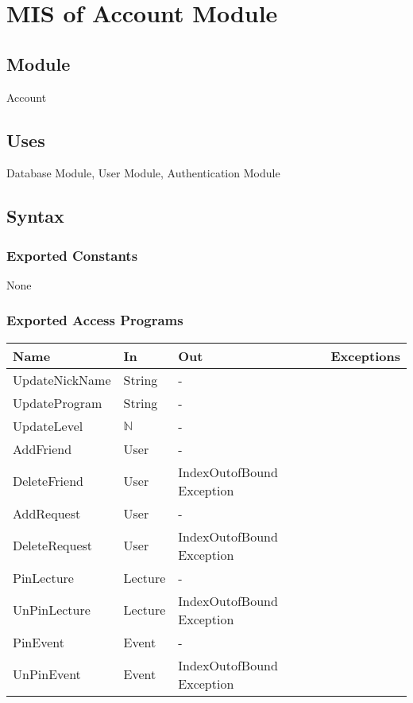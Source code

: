 \documentclass[12pt, titlepage]{article}
\begin{document}
\section{MIS of Account Module} \label{mAccount}

\subsection{Module}

Account

\subsection{Uses}

Database Module, User Module, Authentication Module

\subsection{Syntax}

\subsubsection{Exported Constants}
None

\subsubsection{Exported Access Programs}
\begin{center}
\begin{tabular}{p{4cm} p{2cm} p{4cm} p{4cm}}
\hline
\textbf{Name} & \textbf{In} & \textbf{Out} & \textbf{Exceptions} \\
\hline
UpdateNickName & String & -\\
UpdateProgram & String & -\\
UpdateLevel & $\mathbb{N}$ & -\\
AddFriend & User & -\\
DeleteFriend & User & IndexOutofBound Exception\\
AddRequest & User & -\\
DeleteRequest & User & IndexOutofBound Exception\\
PinLecture & Lecture & - \\
UnPinLecture & Lecture & IndexOutofBound Exception\\
PinEvent & Event & - \\
UnPinEvent & Event & IndexOutofBound Exception\\
\hline
\end{tabular}
\end{center}
\end{document}

